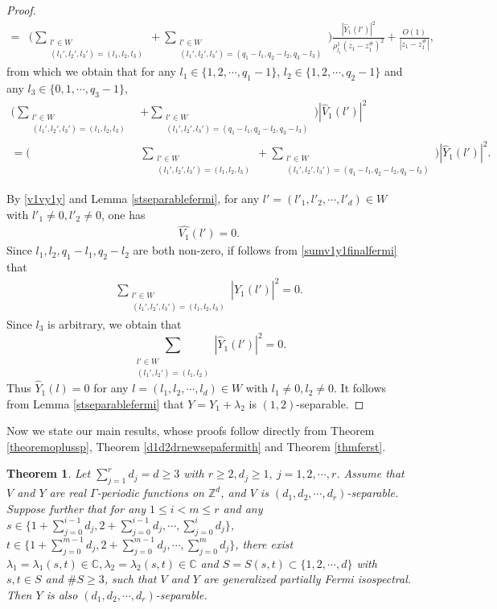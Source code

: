 \documentclass[12pt,letterpaper]{amsart}
\newtheorem{theorem}{Theorem}[section]
\newcommand{\abs}[1]{\left\lvert #1 \right\rvert}
\def\C{{\mathbb C}}
\def\Z{{\mathbb Z}}
\begin{document}
\begin{proof}
\begin{align}
=&\Bigg(\sum_{\substack{l'\in W\\ (l_1',l_2',l_3')=(l_1,l_2,l_3)}}+\sum_{\substack{l'\in W\\ (l_1',l_2',l_3')=(q_1-l_1,q_2-l_2,q_3-l_3)}}\Bigg)\frac{\abs{\hat{Y}_1(l')}^2}{\rho^1_{l_1}(z_1-z_1^{\#})^2}+\frac{O(1)}{\abs{z_1-z_1^{\#}}},\nonumber
\end{align}
from which we obtain that for any $l_1\in \{1,2,\cdots,q_1-1\}$, $l_2\in\{1,2,\cdots,q_2-1\}$ and any $l_3\in\{0,1,\cdots,q_3-1\}$,
\begin{align}
\Bigg(\sum_{\substack{l'\in W\\ (l_1',l_2',l_3')=(l_1,l_2,l_3)}}&+\sum_{\substack{l'\in W\\ (l_1',l_2',l_3')=(q_1-l_1,q_2-l_2,q_3-l_3)}}\Bigg)\abs{\hat{V}_1(l')}^2\nonumber\\
=\Bigg(&\sum_{\substack{l'\in W\\ (l_1',l_2',l_3')=(l_1,l_2,l_3)}}+\sum_{\substack{l'\in W\\ (l_1',l_2',l_3')=(q_1-l_1,q_2-l_2,q_3-l_3)}}\Bigg)\abs{\hat{Y}_1(l')}^2.\label{sumv1y1finalfermi}
\end{align}

By \eqref{v1vy1y} and Lemma \ref{stseparablefermi}, for any $l'=(l'_1,l'_2,\cdots,l'_d)\in W$ with $l'_1\neq 0, l'_2\neq 0$, one has \begin{align}
\hat{V_1}(l')=0.\nonumber
\end{align}
Since $l_1,l_2,q_1-l_1,q_2-l_2$ are both non-zero, if follows from  \eqref{sumv1y1finalfermi} that
\begin{align}
\sum_{\substack{l'\in W\\ (l_1',l_2',l_3')=(l_1,l_2,l_3)}}\abs{\hat{Y}_1(l')}^2=0.\nonumber
\end{align}
Since $l_3$ is arbitrary, we obtain that
$$\sum_{\substack{l'\in W\\ (l_1',l_2')=(l_1,l_2)}}\abs{\hat{Y}_1(l')}^2=0.$$
Thus $\hat{Y}_1(l)=0$ for any $l=(l_1,l_2,\cdots,l_d)\in W$ with $l_1\neq 0, l_2\neq 0$. It follows from Lemma \ref{stseparablefermi} that $Y=Y_1+\lambda_2$ is $(1,2)$-separable.
\end{proof}

Now we state our main results, whose proofs follow directly from Theorem \ref{theoremoplussp}, Theorem \ref{d1d2drnewsepafermith} and Theorem \ref{thmferst}.

\begin{theorem}\label{theofer1}
Let $\sum_{j=1}^rd_j=d\geq 3$ with $r\geq 2,d_j\geq1,\ j=1,2,\cdots,r$. Assume that $V$ and $Y$ are real $\Gamma$-periodic functions on $\Z^d$, and $V$ is $(d_1,d_2,\cdots,d_r)$-separable. Suppose further that for any $1\leq i<m\leq r$ and any $s\in \{1+\sum_{j=0}^{i-1}d_j,2+\sum_{j=0}^{i-1}d_j,\cdots,\sum_{j=0}^{i}d_j\}$, $t\in \{1+\sum_{j=0}^{m-1}d_j,2+\sum_{j=0}^{m-1}d_j,\cdots,\sum_{j=0}^{m}d_j\}$, {there exist $\lambda_1=\lambda_1(s,t)\in\C,\lambda_2=\lambda_2(s,t)\in\C$ and $S=S(s,t)\subset \{1,2,\cdots,d\}$ }with $s,t\in S$ and  $\# S\geq 3$, such that $V$ and $Y$ {are generalized partially Fermi isospectral}. Then $Y$ is also $(d_1,d_2,\cdots,d_r)$-separable.
\end{theorem}
\end{document}
